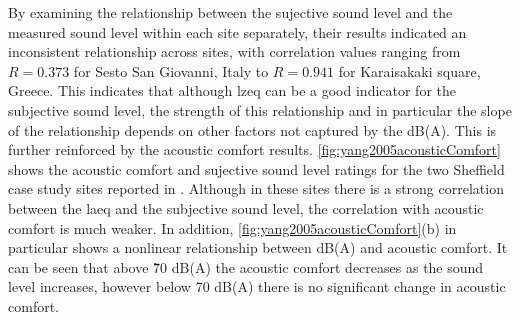 By examining the relationship between the sujective sound level and the measured sound level within each site separately, their results indicated an inconsistent relationship across sites, with correlation values ranging from $R=0.373$ for Sesto San Giovanni, Italy to $R=0.941$ for Karaisakaki square, Greece. This indicates that although \gls{lzeq} can be a good indicator for the subjective sound level, the strength of this relationship and in particular the slope of the relationship depends on other factors not captured by the dB(A). This is further reinforced by the acoustic comfort results. \cref{fig:yang2005acousticComfort} shows the acoustic comfort and sujective sound level ratings for the two Sheffield case study sites reported in \citet{Yang2005Acoustic}. Although in these sites there is a strong correlation between the \gls{laeq} and the subjective sound level, the correlation with acoustic comfort is much weaker. In addition, \cref{fig:yang2005acousticComfort}(b) in particular shows a nonlinear relationship between dB(A) and acoustic comfort. It can be seen that above \~70 dB(A) the acoustic comfort decreases as the sound level increases, however below 70 dB(A) there is no significant change in acoustic comfort. 

